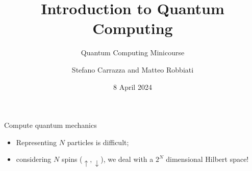 \documentclass[8pt, xcolor={svgnames}, hyperref={linkcolor=black}]{beamer}
\title{Introduction to Quantum Computing}
\subtitle{Quantum Computing Minicourse}
\date{8 April 2024}
\author[Stefano Carrazza and Matteo Robbiati]{Stefano Carrazza and Matteo Robbiati}
\begin{document}
\maketitle

\begin{frame}{Compute quantum mechanics}
\pause
  \begin{itemize}[noitemsep]
  \item<2,3>[\faGear] Representing $N$ particles is difficult;
  \item<3>[\faGears] considering $N$ spins ($\uparrow, \downarrow$), we deal with a $2^N$ dimensional Hilbert space!
  \end{itemize}
  \vspace{0.5cm}
  \begin{multicols}{2}
    \begin{figure}
    \end{figure}
    \begin{figure}
    \end{figure}
\end{multicols}
\end{frame}
\end{document}
